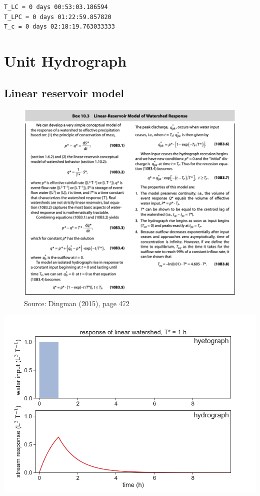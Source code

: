 \documentclass[
  letterpaper,
  DIV=11,
  numbers=noendperiod]{scrreprt}
\begin{document}
\begin{verbatim}
T_LC = 0 days 00:53:03.186594
T_LPC = 0 days 01:22:59.857820
T_c = 0 days 02:18:19.763033333
\end{verbatim}

\hypertarget{unit-hydrograph}{%
\chapter{Unit Hydrograph}\label{unit-hydrograph}}

\hypertarget{linear-reservoir-model}{%
\section{Linear reservoir model}\label{linear-reservoir-model}}

\begin{figure}

{\centering \includegraphics{archive/figures/dingman-box10.3.png}

}

\caption{Source: Dingman (2015), page 472}

\end{figure}

\includegraphics{archive/figures/hyetograph_hydrograph1.png}
\end{document}

